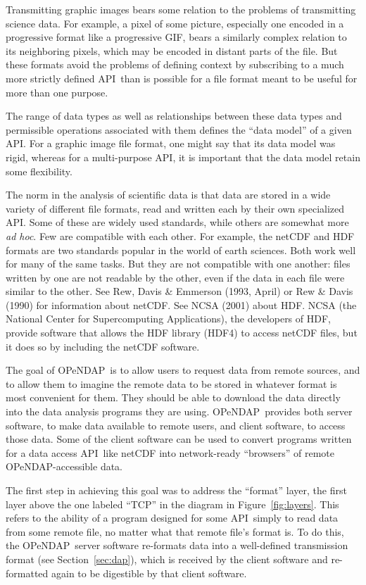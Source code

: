 \documentclass{codata}
\newcommand{\opendap}{\ac{OPeNDAP}}
\newcommand{\api}{\ac{API}}
\begin{document}
Transmitting graphic images bears some relation to the problems of
transmitting science data.  For example, a pixel of some picture,
especially one encoded in a progressive format like a progressive GIF,
bears a similarly complex relation to its neighboring pixels, which
may be encoded in distant parts of the file.  But these formats avoid
the problems of defining context by subscribing to a much more
strictly defined \api\ than is possible for a file format meant to be
useful for more than one purpose.

The range of data types as well as relationships between
these data types and permissible operations associated with them defines
the ``data model'' of a given \api.  For a graphic image file format,
one might say that its data model was rigid, whereas for a
multi-purpose \api, it is important that the data model retain some
flexibility. 


The norm in the analysis of scientific data is that data are stored in
a wide variety of different file formats, read and written each by
their own specialized \api.  Some of these are widely used standards,
while others are somewhat more \emph{ad hoc}.  Few are compatible with
each other.  For example, the netCDF and HDF formats are two standards
popular in the world of earth sciences.  Both work well for many of
the same tasks.  But they are not compatible with one another: files
written by one are not readable by the other, even if the data in each
file were similar to the other.  See Rew, Davis \& Emmerson (1993,
April) or Rew \& Davis (1990) for information about netCDF.  See NCSA
(2001) about HDF.  NCSA (the National Center for Supercomputing
Applications), the developers of HDF, provide software that allows the
HDF library (HDF4) to access netCDF files, but it does so by including
the netCDF software.

The goal of \opendap\ is to allow users to request data from remote
sources, and to allow them to imagine the remote data to be stored in
whatever format is most convenient for them.  They should be able to
download the data directly into the data analysis programs they are
using.  \opendap\ provides both server software, to make data
available to remote users, and client software, to access those data.
Some of the client software can be used to convert programs written
for a data access \api\ like netCDF into network-ready ``browsers'' of
remote \opendap-accessible data.

The first step in achieving this goal was to address the ``format''
layer, the first layer above the one labeled ``TCP'' in
the diagram in Figure~\ref{fig:layers}.  This refers to the ability of
a program designed for some \api\ simply to read data from some remote
file, no matter what that remote file's format is.  To do this, the
\opendap\ server software re-formats data into a well-defined
transmission format (see Section~\ref{sec:dap}), which is received by
the client software and re-formatted again to be digestible by that
client software.
\end{document}
